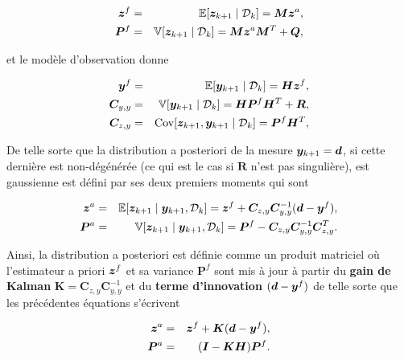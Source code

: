 \begin{eqnarray*}
    \bm z^f &=& \mathbb{E} [\bm z_{k+1} \mid \mathcal D_k] = \bm M \bm z^a,\\
    \bm  P^f &=& \mathbb{V} [\bm z_{k+1} \mid \mathcal D_k] = \bm M \bm z^a \bm M^T + \bm Q,
\end{eqnarray*}

et le modèle d'observation donne

\begin{eqnarray*}
    \bm{y}^f &=& \mathbb{E} [\bm y_{k+1} \mid \mathcal D_k] = \bm H \bm z^f,\\
    \bm C_{y,y}&=&\mathbb{V} [\bm y_{k+1} \mid \mathcal D_k] = \bm H \bm  P^f \bm H^T + \bm R, \\
    \bm C_{z,y} &=& \text{Cov}[\bm z_{k+1}, \bm y_{k+1}\mid \mathcal D_k] =\bm  P^f \bm H^T,
\end{eqnarray*}

De telle sorte que la distribution a posteriori de la mesure $\bm{y}_{k+1} = \bm d$, si cette dernière est non-dégénérée (ce qui est le cas si $\bm R$ n'est pas singulière), est gaussienne est défini par ses deux premiers moments qui sont

\begin{eqnarray*}
    \bm z^a &=& \mathbb{E}[\bm z_{k+1} \mid \bm y_{k+1},\mathcal D_k] = \bm z^f + \bm C_{z,y} \bm C_{y,y}^{-1} (\bm d - \bm{y}^f), \\
    \bm  P^a &=& \mathbb{V}[\bm z_{k+1} \mid \bm y_{k+1},\mathcal D_k] = \bm  P^f - \bm C_{z,y} \bm C_{y,y}^{-1} \bm C_{z,y}^T.
\end{eqnarray*}

Ainsi, la distribution a posteriori est définie comme un produit matriciel où l'estimateur a priori $\bm z^f$ et sa variance $\bm  P^f$ sont mis à jour à partir du \textbf{gain de Kalman} $\bm K = \bm C_{z,y} \bm C_{y,y}^{-1}$ et du \textbf{terme d'innovation} $(\bm{d} - \bm{y}^f)$ de telle sorte que les précédentes équations s'écrivent

\begin{eqnarray*}
    \bm z^a &=& \bm z^f + \bm K (\bm{d} - \bm{y}^f), \\
    \bm  P^a &=& (\bm I - \bm K\bm H)\bm  P^f. \\
\end{eqnarray*}


